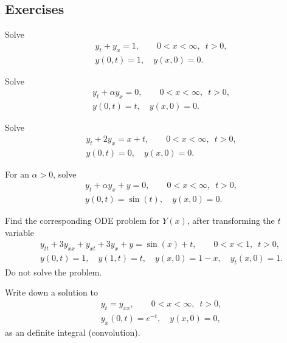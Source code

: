 \subsection{Exercises}

\begin{exercise}
Solve
\begin{align*}
& y_t + y_x = 1, \qquad 0 < x < \infty, \enspace t > 0,
\\
& y(0,t) = 1, \quad y(x,0) = 0 .
\end{align*}
\end{exercise}

\begin{exercise}
Solve
\begin{align*}
& y_t + \alpha y_x = 0, \qquad 0 < x < \infty, \enspace t > 0,
\\
& y(0,t) = t, \quad y(x,0) = 0 .
\end{align*}
\end{exercise}

\begin{exercise}
Solve
\begin{align*}
& y_t + 2 y_x = x+t, \qquad 0 < x < \infty, \enspace t > 0,
\\
& y(0,t) = 0, \quad y(x,0) = 0 .
\end{align*}
\end{exercise}

\begin{exercise}
For an $\alpha > 0$, solve
\begin{align*}
& y_t + \alpha y_x + y = 0, \qquad 0 < x < \infty, \enspace t > 0,
\\
& y(0,t) = \sin(t), \quad y(x,0) = 0 .
\end{align*}
\end{exercise}

\begin{exercise}
Find the corresponding ODE problem for $Y(x)$, after transforming the $t$
variable
\begin{align*}
& y_{tt} + 3y_{xx} + y_{xt} + 3 y_x + y = \sin(x) + t, \qquad 0 < x < 1, \enspace t > 0,
\\
& y(0,t) = 1, \quad y(1,t) =  t, \quad y(x,0) = 1-x, \quad y_t(x,0) = 1 .
\end{align*}
Do not solve the problem.
\end{exercise}

\begin{exercise}
Write down a solution to
\begin{align*}
& y_t = y_{xx}, \qquad 0 < x < \infty, \enspace t > 0,\\
& y_x(0,t) = e^{-t}, \quad y(x,0) = 0 ,
\end{align*}
as an definite integral (convolution).
\end{exercise}

